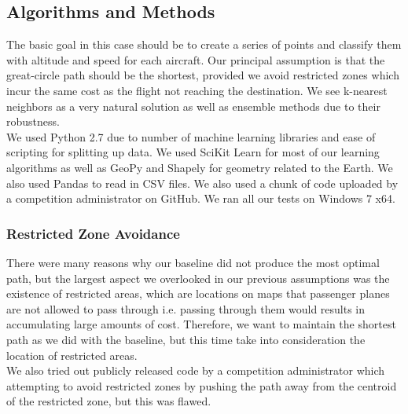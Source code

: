 \documentclass{article}[12pt]
\begin{document}
\begin{multicols}{2}
\subsection{Algorithms and Methods}

The basic goal in this case should be to create a series of points and classify them with altitude and speed for each aircraft. Our principal assumption is that the great-circle path should be the shortest, provided we avoid restricted zones which incur the same cost as the flight not reaching the destination. We see k-nearest neighbors as a very natural solution as well as ensemble methods due to their robustness.\\

We used Python 2.7 due to number of machine learning libraries and ease of scripting for splitting up data. We used SciKit Learn for most of our learning algorithms as well as GeoPy and Shapely for geometry related to the Earth. We also used Pandas to read in CSV files. We also used a chunk of code uploaded by a competition administrator on GitHub. We ran all our tests on Windows 7 x64.

\subsubsection{Restricted Zone Avoidance}

There were many reasons why our baseline did not produce the most optimal path, but the largest aspect we overlooked in our previous assumptions was the existence of restricted areas, which are locations on maps that passenger planes are not allowed to pass through i.e. passing through them would results in accumulating large amounts of cost. Therefore, we want to maintain the shortest path as we did with the baseline, but this time take into consideration the location of restricted areas.\\

We also tried out publicly released code by a competition administrator which attempting to avoid restricted zones by pushing the path away from the centroid of the restricted zone, but this was flawed.


\end{multicols}
\end{document}
